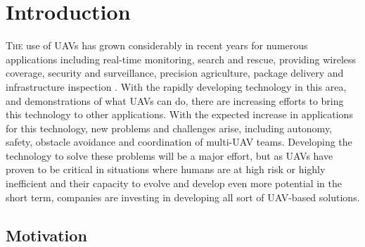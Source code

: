 \chapter{Introduction}
\label{ch:Introduction}
\lettrine[lraise=-0.1, lines=2, loversize=0.2]{T}{he} use of \glspl{UAV} has grown considerably in recent years for numerous applications including real-time monitoring, search and rescue, providing wireless coverage, security and surveillance, precision agriculture, package delivery and infrastructure inspection \cite{CivilAplications}. With the rapidly developing technology in this area, and demonstrations of what \glspl{UAV} can do, there are increasing efforts to bring this technology to other applications. With the expected increase in applications for this technology, new problems and challenges arise, including autonomy, safety, obstacle avoidance and coordination of multi-\gls{UAV} teams. Developing the technology to solve these problems will be a major effort, but as \glspl{UAV} have proven to be critical in situations where humans are at high risk or highly inefficient and their capacity to evolve and develop even more potential in the short term, companies are investing in developing all sort of \gls{UAV}-based solutions.

\section{Motivation}
\label{sec:Motivation}



